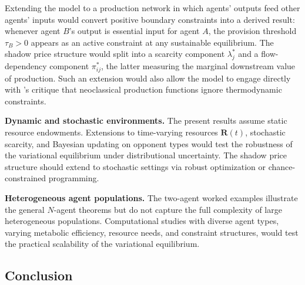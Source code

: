 \documentclass[11pt]{article}
\theoremstyle{plain}
\theoremstyle{definition}
\theoremstyle{remark}
\let\origsubsection\subsection
\renewcommand{\subsection}{\needspace{7\baselineskip}\origsubsection}
\begin{document}
Extending the model to a production network in which agents' outputs
feed other agents' inputs would convert positive boundary constraints
into a derived result: whenever agent \(B\)'s output is essential input
for agent \(A\), the provision threshold \(\tau_B > 0\) appears as an
active constraint at any sustainable equilibrium. The shadow price
structure would split into a scarcity component \(\lambda_j^*\) and a
flow-dependency component \(\pi_{ij}^*\), the latter measuring the
marginal downstream value of production. Such an extension would also
allow the model to engage directly with \citet{GeorgescuRoegen1971}'s
critique that neoclassical production functions ignore thermodynamic
constraints.

\textbf{Dynamic and stochastic environments.} The present results assume
static resource endowments. Extensions to time-varying resources
\(\mathbf{R}(t)\), stochastic scarcity, and Bayesian updating on
opponent types \citep{OsborneRubinstein1994} would test the robustness
of the variational equilibrium under distributional uncertainty. The
shadow price structure should extend to stochastic settings via robust
optimization or chance-constrained programming.

\textbf{Heterogeneous agent populations.} The two-agent worked examples
illustrate the general \(N\)-agent theorems but do not capture the full
complexity of large heterogeneous populations. Computational studies
with diverse agent types, varying metabolic efficiency, resource needs,
and constraint structures, would test the practical scalability of the
variational equilibrium.

\subsection{Conclusion}\label{conclusion}
\end{document}
